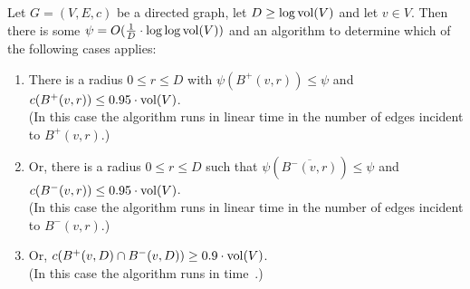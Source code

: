 \documentclass[letterpaper,11pt]{article}
\begin{document}
\begin{lemma} \label{lem:sparse-cut-det}
Let $G = (V, E, c)$ be a directed graph, let $D \geq \log \operatorname{vol}(V)$ and let $v \in V$. Then there is some $\psi = O(\frac{1}{D} \cdot \log\log \operatorname{vol}(V))$ and an algorithm to determine which of the following cases applies:
\begin{enumerate}[label=(\roman*)]
	\item There is a radius $0 \leq r \leq D$ with $\psi(B^+(v, r)) \leq \psi$ and $c(B^+(v, r)) \leq 0.95 \cdot \operatorname{vol}(V)$.\\(In this case the algorithm runs in linear time in the number of edges incident to $B^+(v, r)$.)
	\item Or, there is a radius $0 \leq r \leq D$ such that $\psi(\overline{B^-(v, r)}) \leq \psi$ and $c(B^-(v, r)) \leq 0.95 \cdot \operatorname{vol}(V)$.\\(In this case the algorithm runs in linear time in the number of edges incident to $B^-(v, r)$.)
	\item Or, $c(B^+(v, D) \cap B^-(v, D)) \geq 0.9 \cdot \operatorname{vol}(V)$.\\(In this case the algorithm runs in time~.)
\end{enumerate}
\end{lemma}
\end{document}
